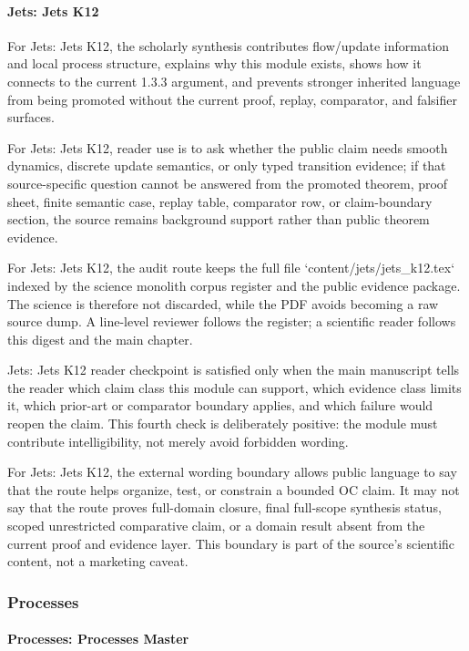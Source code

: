 \paragraph{Jets: Jets K12}

For Jets: Jets K12, the scholarly synthesis contributes flow/update information and local process structure, explains why this module exists, shows how it connects to the current 1.3.3 argument, and prevents stronger inherited language from being promoted without the current proof, replay, comparator, and falsifier surfaces.


For Jets: Jets K12, reader use is to ask whether the public claim needs smooth dynamics, discrete update semantics, or only typed transition evidence; if that source-specific question cannot be answered from the promoted theorem, proof sheet, finite semantic case, replay table, comparator row, or claim-boundary section, the source remains background support rather than public theorem evidence.


For Jets: Jets K12, the audit route keeps the full file `content/jets/jets\_k12.tex` indexed by the science monolith corpus register and the public evidence package. The science is therefore not discarded, while the PDF avoids becoming a raw source dump. A line-level reviewer follows the register; a scientific reader follows this digest and the main chapter.


Jets: Jets K12 reader checkpoint is satisfied only when the main manuscript tells the reader which claim class this module can support, which evidence class limits it, which prior-art or comparator boundary applies, and which failure would reopen the claim. This fourth check is deliberately positive: the module must contribute intelligibility, not merely avoid forbidden wording.


For Jets: Jets K12, the external wording boundary allows public language to say that the route helps organize, test, or constrain a bounded OC claim. It may not say that the route proves full-domain closure, final full-scope synthesis status, scoped unrestricted comparative claim, or a domain result absent from the current proof and evidence layer. This boundary is part of the source's scientific content, not a marketing caveat.


\subsubsection{Processes}

\paragraph{Processes: Processes Master}

